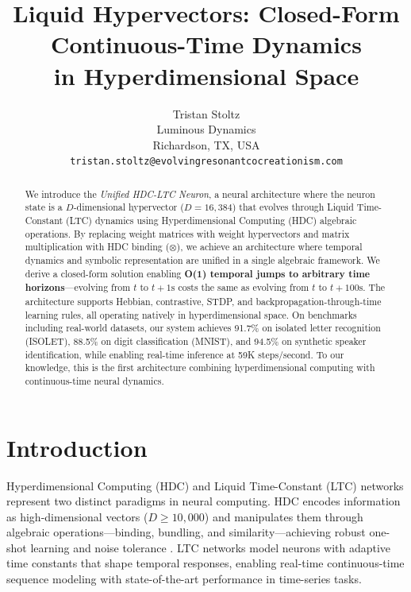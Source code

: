 \documentclass{article}
\title{Liquid Hypervectors: Closed-Form Continuous-Time Dynamics\\in Hyperdimensional Space}
\author{
  Tristan Stoltz \\
  Luminous Dynamics\\
  Richardson, TX, USA \\
  \texttt{tristan.stoltz@evolvingresonantcocreationism.com}
}
\newcommand{\bind}{\otimes}
\begin{document}
\maketitle

\begin{abstract}
We introduce the \emph{Unified HDC-LTC Neuron}, a neural architecture where the neuron state is a $D$-dimensional hypervector ($D{=}16{,}384$) that evolves through Liquid Time-Constant (LTC) dynamics using Hyperdimensional Computing (HDC) algebraic operations. By replacing weight matrices with weight hypervectors and matrix multiplication with HDC binding ($\bind$), we achieve an architecture where temporal dynamics and symbolic representation are unified in a single algebraic framework. We derive a closed-form solution enabling \textbf{O(1) temporal jumps to arbitrary time horizons}---evolving from $t$ to $t{+}1\text{s}$ costs the same as evolving from $t$ to $t{+}100\text{s}$. The architecture supports Hebbian, contrastive, STDP, and backpropagation-through-time learning rules, all operating natively in hyperdimensional space. On benchmarks including real-world datasets, our system achieves 91.7\% on isolated letter recognition (ISOLET), 88.5\% on digit classification (MNIST), and 94.5\% on synthetic speaker identification, while enabling real-time inference at 59K steps/second. To our knowledge, this is the first architecture combining hyperdimensional computing with continuous-time neural dynamics.
\end{abstract}

\section{Introduction}
\label{sec:intro}

Hyperdimensional Computing (HDC) and Liquid Time-Constant (LTC) networks represent two distinct paradigms in neural computing. HDC \cite{kanerva2009hyperdimensional,plate2003holographic,gayler2003vector} encodes information as high-dimensional vectors ($D \geq 10{,}000$) and manipulates them through algebraic operations---binding, bundling, and similarity---achieving robust one-shot learning and noise tolerance \cite{kleyko2023survey}. LTC networks \cite{hasani2021liquid,hasani2022closed} model neurons with adaptive time constants that shape temporal responses, enabling real-time continuous-time sequence modeling with state-of-the-art performance in time-series tasks.
\end{document}
